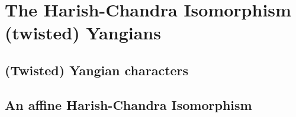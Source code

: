 \section{The Harish-Chandra Isomorphism (twisted) Yangians}
    \subsection{(Twisted) Yangian characters}

    \subsection{An affine Harish-Chandra Isomorphism}